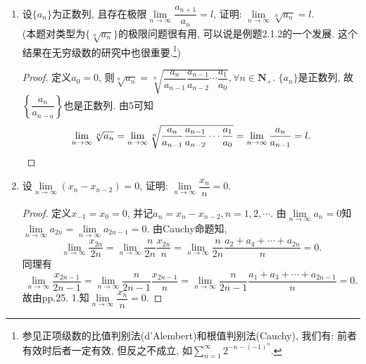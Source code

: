 \documentclass[a4paper,11pt,twoside]{ctexbook}
\begin{document}
\begin{enumerate}
\begin{proof}
		      若$A>0$, 则$\lim\limits_{n\to\infty} \dfrac{1}{a_n}=\dfrac{1}{A}$, 由Cauchy命题知
		      \[
			      \lim\limits_{n\to\infty} \dfrac{n}{\frac{1}{a_1}+\frac{1}{a_2}+\cdots+\frac{1}{a_n}}=\lim\limits_{n\to\infty} \dfrac{1}{\dfrac{\frac{1}{a_1}+\frac{1}{a_2}+\cdots+\frac{1}{a_n}}{n}}=\dfrac{1}{\frac{1}{A}}=A,
		      \]
		      \[
			      \lim\limits_{n\to\infty} \dfrac{a_1+a_2+\cdots+a_n}{n}=A.
		      \]
		      故由夹逼定理知, $\lim\limits_{n\to\infty} (a_1a_2\cdots a_n)^\frac{1}{n}=A$.\qedhere
	      \end{proof}
	\item 设$\{a_n\}$为正数列, 且存在极限$\lim\limits_{n\to\infty} \dfrac{a_{n+1}}{a_n}=l$, 证明: $\lim\limits_{n\to\infty} \sqrt[n]{a_n}=l$.\\
	      (本题对类型为$\{\sqrt[n]{a_n}\}$的极限问题很有用, 可以说是例题2.1.2的一个发展. 这个结果在无穷级数的研究中也很重要.\footnote{参见正项级数的比值判别法(d'Alembert)和根值判别法(Cauchy), 我们有: 前者有效时后者一定有效, 但反之不成立, 如$\sum_{n=1}^{\infty} 2^{-n-(-1)^n}$.})
	      \begin{proof}
		      定义$a_0=0$, 则$\sqrt[n]{a_n}=\sqrt[n]{\dfrac{a_n}{a_{n-1}}\dfrac{a_{n-1}}{a_{n-2}}\cdots\dfrac{a_1}{a_0}}, \forall n\in\mathbf{N}_{+}$. $\{a_n\}$是正数列, 故$\left\{\dfrac{a_n}{a_{n-a}}\right\}$也是正数列. 由5可知
		      \[
			      \lim\limits_{n\to\infty} \sqrt[n]{a_n}=\lim\limits_{n\to\infty} \sqrt[n]{\dfrac{a_n}{a_{n-1}}\dfrac{a_{n-1}}{a_{n-2}}\cdots\dfrac{a_1}{a_0}}=\lim\limits_{n\to\infty} \dfrac{a_n}{a_{n-1}}=l.\qedhere
		      \]
	      \end{proof}
	\item 设$\lim\limits_{n\to\infty} (x_n-x_{n-2})=0$, 证明: $\lim\limits_{n\to\infty} \dfrac{x_n}{n}=0$.
	      \begin{proof}
		      定义$x_{-1}=x_0=0$, 并记$a_n=x_n-x_{n-2}, n=1,2,\cdots$. 由$\lim\limits_{n\to\infty} a_n=0$知$\lim\limits_{n\to\infty} a_{2n}=\lim\limits_{n\to\infty} a_{2n-1}=0$. 由Cauchy命题知,
		      \[
			      \lim\limits_{n\to\infty} \dfrac{x_{2n}}{2n}=\lim\limits_{n\to\infty} \dfrac{n}{2n}\dfrac{x_{2n}}{n}=\lim\limits_{n\to\infty} \dfrac{n}{2n}\dfrac{a_2+a_4+\cdots+a_{2n}}{n}=0.
		      \]
		      同理有
		      \[
			      \lim\limits_{n\to\infty} \dfrac{x_{2n-1}}{2n-1}=\lim\limits_{n\to\infty} \dfrac{n}{2n-1}\dfrac{x_{2n-1}}{n}=\lim\limits_{n\to\infty} \dfrac{n}{2n-1}\dfrac{a_1+a_3+\cdots+a_{2n-1}}{n}=0.
		      \]
		      故由pp.25. 1.知$\lim\limits_{n\to\infty} \dfrac{x_n}{n}=0$.\qedhere
	      \end{proof}

\end{enumerate}
\end{document}
